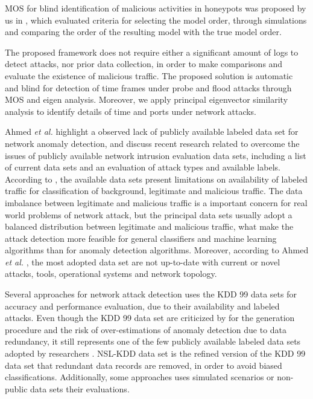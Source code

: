 MOS for blind identification of malicious activities in honeypots was proposed by us in \cite{david2011blind}, which evaluated criteria for selecting the model order, through simulations and comparing the order of the resulting model with the true model order.

The proposed framework does not require either a significant amount of logs to detect attacks, nor prior data collection, in order to make comparisons and evaluate the existence of malicious traffic. The proposed solution is automatic and blind for detection of time frames under probe and flood attacks through MOS and eigen analysis. Moreover, we apply principal eigenvector similarity analysis to identify details of time and ports under network attacks.

Ahmed \emph{et al.} \cite{ahmed2016survey} highlight a observed lack of publicly available labeled data set for network anomaly detection, and discuss recent research related to overcome the issues of publicly available network intrusion evaluation data sets, including a list of current data sets and an evaluation of attack types and available labels. According to \cite{ahmed2016survey}, the available data sets present limitations on availability of labeled traffic for classification of background, legitimate and malicious traffic. The data imbalance between legitimate and malicious traffic is a important concern for real world problems of network attack, but the principal data sets usually adopt a balanced distribution between legitimate and malicious traffic, what make the attack detection more feasible for general classifiers and machine learning algorithms than for anomaly detection algorithms. Moreover, according to Ahmed \emph{et al.} \cite{ahmed2016survey}, the most adopted data set are not up-to-date with current or novel attacks, tools, operational systems and network topology.

Several approaches for network attack detection uses the KDD 99 \cite{ji2016multi, ahmed2016survey, osanaiye2016distributed, bhuyan2014network} data sets for accuracy and performance evaluation, due to their availability and labeled attacks. Even though the KDD 99 data set are criticized by for the generation procedure and the risk of over-estimations of anomaly detection due to data redundancy, it still represents one of the few publicly available labeled data sets adopted by researchers \cite{osanaiye2016distributed, bhuyan2014network}. NSL-KDD \cite{tavallaee2009detailed} data set is the refined version of the KDD 99 data set that redundant data records are removed, in order to avoid biased classifications. Additionally, some approaches uses simulated \cite{callegari2011novel} scenarios or non-public data sets their evaluations. 

